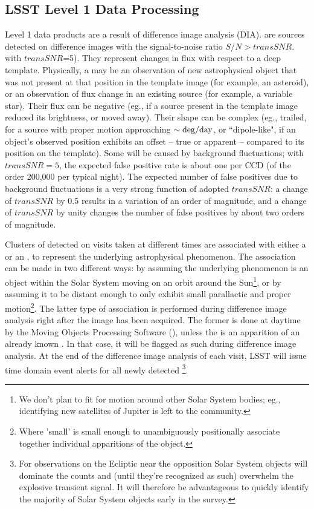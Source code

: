\subsection{LSST Level 1 Data Processing} 

Level 1 data products are a result of difference image analysis (DIA). 
\DIASources are sources detected on difference images with the signal-to-noise ratio $S/N>transSNR$. 
with $transSNR$=5). 
They represent changes in flux with respect to a deep template. Physically, a \DIASource may be an observation of new astrophysical object that was not present at that position in the template image (for example, an asteroid), or an observation of flux change in an existing source (for example, a variable star). Their flux can be negative (eg., if a source present in the template image reduced its brightness, or moved away). Their shape can be complex (eg., trailed, for a source with proper motion approaching $\sim {\rm deg}/{\rm day}$, or ``dipole-like", if an object's observed position exhibits an offset -- true or apparent -- compared to its position on the template). 
Some \DIASources will be caused by background fluctuations; with $transSNR = 5$, 
the expected false positive rate is about one per CCD (of the order 200,000 per typical night). 
The expected number of false positives due to background fluctuations is a very strong function 
of adopted $transSNR$: a change of $transSNR$ by 0.5
results in a variation of an order of magnitude, and a change of $transSNR$ by unity changes the number of false
positives by about two orders of magnitude.

Clusters of \DIASources detected on visits taken at different times are associated with either a \DIAObject or an \SSObject, to represent the underlying astrophysical phenomenon. The association can be made in two different ways: by assuming the underlying phenomenon is an object within the Solar System moving on an orbit around the Sun\footnote{We don't plan to fit for motion around other Solar System bodies; eg., identifying new satellites of Jupiter is left to the community.}, or by assuming it to be distant enough to only exhibit small parallactic and proper motion\footnote{Where 'small' is small enough to unambiguously positionally associate together individual apparitions of the object.}. The latter type of association is performed during difference image analysis right after the image has been acquired. The former is done at daytime by the Moving Objects Processing Software (), unless the \DIASource is an apparition of an already known \SSObject. In that case, it will be flagged as such during difference image analysis. At the end of the difference image analysis of each visit, LSST will issue time domain event alerts for all 
newly detected \DIASources\footnote{For observations on the Ecliptic near the opposition Solar System objects will dominate the \DIASource counts and (until they're recognized as such) overwhelm the explosive transient signal. It will therefore be advantageous to quickly identify the majority of Solar System objects early in the survey.}.

